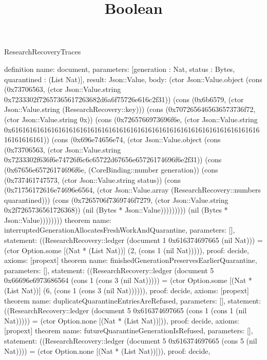\begin{lexlean}{ResearchRecoveryTraces}
\title{Boolean}
\begin{semanticmodule}
definition{
 name: document,
 parameters: [generation : Nat, status : Bytes, quarantined : (List Nat)],
 result: Json::Value,
 body: (ctor Json::Value.object (cons (0x73706563, (ctor Json::Value.string 0x7233302f72657365617263682d6a6f75726e616c2f31)) (cons (0x6b6579, (ctor Json::Value.string (ResearchRecovery::key))) (cons (0x7072656465636573736f72, (ctor Json::Value.string 0x)) (cons (0x7265766973696f6e, (ctor Json::Value.string 0x61616161616161616161616161616161616161616161616161616161616161616161616161616161)) (cons (0x696e74656e74, (ctor Json::Value.object (cons (0x73706563, (ctor Json::Value.string 0x7233302f636f6e74726f6c6c65722d67656e65726174696f6e2f31)) (cons (0x67656e65726174696f6e, (CoreBinding::number generation)) (cons (0x737461747573, (ctor Json::Value.string status)) (cons (0x71756172616e74696e6564, (ctor Json::Value.array (ResearchRecovery::numbers quarantined))) (cons (0x7265706f7369746f7279, (ctor Json::Value.string 0x2f7265736561726368)) (nil (Bytes * Json::Value))))))))) (nil (Bytes * Json::Value))))))))
}
theorem{
 name: interruptedGenerationAllocatesFreshWorkAndQuarantine,
 parameters: [],
 statement: ((ResearchRecovery::ledger (document 1 0x616374697665 (nil Nat))) = (ctor Option.some [(Nat * (List Nat))] (2, (cons 1 (nil Nat))))),
 proof: decide{},
 axioms: [propext]
}
theorem{
 name: finishedGenerationPreservesEarlierQuarantine,
 parameters: [],
 statement: ((ResearchRecovery::ledger (document 5 0x66696e6973686564 (cons 1 (cons 3 (nil Nat))))) = (ctor Option.some [(Nat * (List Nat))] (6, (cons 1 (cons 3 (nil Nat)))))),
 proof: decide{},
 axioms: [propext]
}
theorem{
 name: duplicateQuarantineEntriesAreRefused,
 parameters: [],
 statement: ((ResearchRecovery::ledger (document 5 0x616374697665 (cons 1 (cons 1 (nil Nat))))) = (ctor Option.none [(Nat * (List Nat))])),
 proof: decide{},
 axioms: [propext]
}
theorem{
 name: futureQuarantineGenerationIsRefused,
 parameters: [],
 statement: ((ResearchRecovery::ledger (document 5 0x616374697665 (cons 5 (nil Nat)))) = (ctor Option.none [(Nat * (List Nat))])),
 proof: decide{},
}
\end{semanticmodule}
\end{lexlean}
